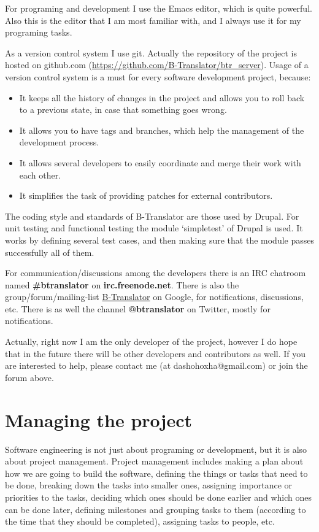 \documentclass[11pt]{article}
\begin{document}
  For programing and development I use the Emacs editor, which is
  quite powerful. Also this is the editor that I am most familiar
  with, and I always use it for my programing tasks.

  As a version control system I use git. Actually the repository of
  the project is hosted on github.com
  (\href{https://github.com/B-Translator/btr_server}{https://github.com/B-Translator/btr_server}). Usage of a version control
  system is a must for every software development project, because:
\begin{itemize}
\item It keeps all the history of changes in the project and allows you
    to roll back to a previous state, in case that something goes
    wrong.
\item It allows you to have tags and branches, which help the management
    of the development process.
\item It allows several developers to easily coordinate and merge their
    work with each other.
\item It simplifies the task of providing patches for external
    contributors.
\end{itemize}
  The coding style and standards of B-Translator are those used by
  Drupal.  For unit testing and functional testing the module
  `simpletest' of Drupal is used. It works by defining several test
  cases, and then making sure that the module passes successfully all
  of them.

  For communication/discussions among the developers there is an IRC
  chatroom named \textbf{\#btranslator} on \textbf{irc.freenode.net}. There is also
  the group/forum/mailing-list \href{https://groups.google.com/forum/?hl=en&fromgroups#!categories/btranslator}{B-Translator} on Google, for
  notifications, discussions, etc. There is as well the channel
  \textbf{@btranslator} on Twitter, mostly for notifications.

  Actually, right now I am the only developer of the project, however
  I do hope that in the future there will be other developers and
  contributors as well. If you are interested to help, please contact
  me (at dashohoxha@gmail.com) or join the forum above.


\section{Managing the project}
\label{sec-7}


  Software engineering is not just about programing or development,
  but it is also about project management. Project management includes
  making a plan about how we are going to build the software, defining
  the things or tasks that need to be done, breaking down the tasks
  into smaller ones, assigning importance or priorities to the tasks,
  deciding which ones should be done earlier and which ones can be
  done later, defining milestones and grouping tasks to them
  (according to the time that they should be completed), assigning
  tasks to people, etc.
\end{document}
